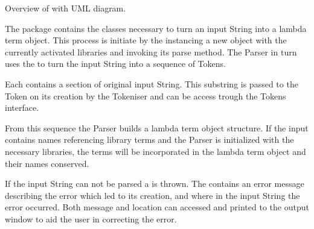 Overview of \texttt{\pkg} with UML diagram.

The \texttt{} package contains the classes necessary to turn an input String into a lambda term object.
This process is initiate by the {} instancing a new {} object with the currently activated libraries and invoking its parse method. The Parser in turn uses the {} to turn the input String into a sequence of Tokens. 

Each {} contains a section of original input String. This substring is passed to the Token on its creation by the Tokeniser and can be access trough the Tokens interface.

From this sequence the Parser builds a lambda term object structure.
If the input contains names referencing library terms and the Parser is initialized with the necessary libraries, the terms will be incorporated in the lambda term object and their names conserved.
 
If the input String can not be parsed a {} is thrown.
The {} contains an error message describing the error which led to its creation, and where in the input String the error occurred.
Both message and location can accessed and printed to the output window to aid the user in correcting the error.
